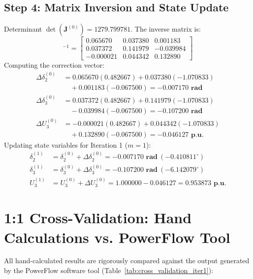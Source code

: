 \documentclass[12pt,a4paper,oneside]{report}
\begin{document}
\subsection{Step 4: Matrix Inversion and State Update}
Determinant $\det(\mathbf{J}^{(0)}) = 1279.799781$. The inverse matrix is:
\begin{equation}
[\mathbf{J}^{(0)}]^{-1} = 
\begin{bmatrix}
0.065670 & 0.037380 & 0.001183 \\
0.037372 & 0.141979 & -0.039984 \\
-0.000021 & 0.044342 & 0.132890
\end{bmatrix}
\end{equation}
Computing the correction vector:
\begin{align}
\Delta \delta_2^{(0)} &= 0.065670(0.482667) + 0.037380(-1.070833) \nonumber \\
&\quad + 0.001183(-0.067500) = \mathbf{-0.007170\text{ rad}} \\
\Delta \delta_3^{(0)} &= 0.037372(0.482667) + 0.141979(-1.070833) \nonumber \\
&\quad - 0.039984(-0.067500) = \mathbf{-0.107200\text{ rad}} \\
\Delta U_3^{(0)} &= -0.000021(0.482667) + 0.044342(-1.070833) \nonumber \\
&\quad + 0.132890(-0.067500) = \mathbf{-0.046127\text{ p.u.}}
\end{align}
Updating state variables for Iteration 1 ($m = 1$):
\begin{align}
\delta_2^{(1)} &= \delta_2^{(0)} + \Delta \delta_2^{(0)} = \mathbf{-0.007170\text{ rad}}\ (-0.410811^\circ) \\
\delta_3^{(1)} &= \delta_3^{(0)} + \Delta \delta_3^{(0)} = \mathbf{-0.107200\text{ rad}}\ (-6.142079^\circ) \\
U_3^{(1)} &= U_3^{(0)} + \Delta U_3^{(0)} = 1.000000 - 0.046127 = \mathbf{0.953873\text{ p.u.}}
\end{align}

\section{1:1 Cross-Validation: Hand Calculations vs. PowerFlow Tool}
All hand-calculated results are rigorously compared against the output generated by the PowerFlow software tool (Table~\ref{tab:cross_validation_iter1}):
\end{document}
